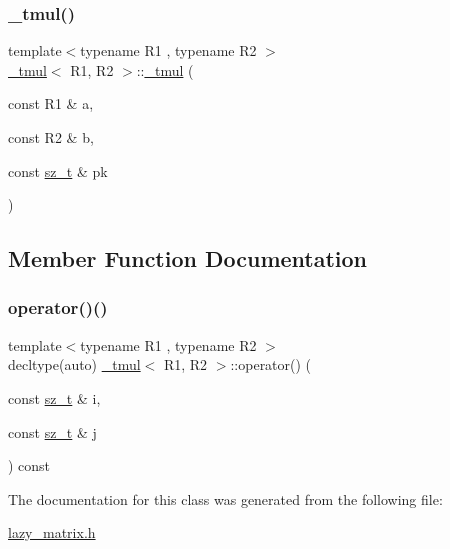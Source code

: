 \subsubsection{\texorpdfstring{\_tmul()}{\_tmul()}}
{\footnotesize\ttfamily template$<$typename R1 , typename R2 $>$ \\
\mbox{\hyperlink{class__tmul}{\+\_\+tmul}}$<$ R1, R2 $>$\+::\mbox{\hyperlink{class__tmul}{\+\_\+tmul}} (\begin{DoxyParamCaption}\item[{const R1 \&}]{a,  }\item[{const R2 \&}]{b,  }\item[{const \mbox{\hyperlink{lazy__matrix_8h_acba2745dcfc55b2d05ff45adc6a0a015}{sz\+\_\+t}} \&}]{pk }\end{DoxyParamCaption})\hspace{0.3cm}{\ttfamily [inline]}}



\subsection{Member Function Documentation}
\mbox{\label{class__tmul_a1ea745e3d3569e49fe68d29ca9ad416b}} 
\subsubsection{\texorpdfstring{operator()()}{operator()()}}
{\footnotesize\ttfamily template$<$typename R1 , typename R2 $>$ \\
decltype(auto) \mbox{\hyperlink{class__tmul}{\+\_\+tmul}}$<$ R1, R2 $>$\+::operator() (\begin{DoxyParamCaption}\item[{const \mbox{\hyperlink{lazy__matrix_8h_acba2745dcfc55b2d05ff45adc6a0a015}{sz\+\_\+t}} \&}]{i,  }\item[{const \mbox{\hyperlink{lazy__matrix_8h_acba2745dcfc55b2d05ff45adc6a0a015}{sz\+\_\+t}} \&}]{j }\end{DoxyParamCaption}) const\hspace{0.3cm}{\ttfamily [inline]}}



The documentation for this class was generated from the following file\+:\begin{DoxyCompactItemize}
\item 
\mbox{\hyperlink{lazy__matrix_8h}{lazy\+\_\+matrix.\+h}}\end{DoxyCompactItemize}

